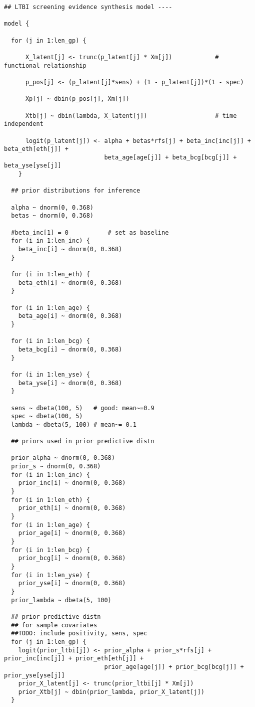 \documentclass[]{article}
\begin{document}
\begin{verbatim}
## LTBI screening evidence synthesis model ----

model {

  for (j in 1:len_gp) {

      X_latent[j] <- trunc(p_latent[j] * Xm[j])            # functional relationship

      p_pos[j] <- (p_latent[j]*sens) + (1 - p_latent[j])*(1 - spec)

      Xp[j] ~ dbin(p_pos[j], Xm[j])

      Xtb[j] ~ dbin(lambda, X_latent[j])                   # time independent

      logit(p_latent[j]) <- alpha + betas*rfs[j] + beta_inc[inc[j]] + beta_eth[eth[j]] +
                            beta_age[age[j]] + beta_bcg[bcg[j]] + beta_yse[yse[j]]
    }

  ## prior distributions for inference

  alpha ~ dnorm(0, 0.368)
  betas ~ dnorm(0, 0.368)

  #beta_inc[1] = 0           # set as baseline
  for (i in 1:len_inc) {
    beta_inc[i] ~ dnorm(0, 0.368)
  }

  for (i in 1:len_eth) {
    beta_eth[i] ~ dnorm(0, 0.368)
  }

  for (i in 1:len_age) {
    beta_age[i] ~ dnorm(0, 0.368)
  }

  for (i in 1:len_bcg) {
    beta_bcg[i] ~ dnorm(0, 0.368)
  }

  for (i in 1:len_yse) {
    beta_yse[i] ~ dnorm(0, 0.368)
  }

  sens ~ dbeta(100, 5)   # good: mean~=0.9
  spec ~ dbeta(100, 5)
  lambda ~ dbeta(5, 100) # mean~= 0.1

  ## priors used in prior predictive distn

  prior_alpha ~ dnorm(0, 0.368)
  prior_s ~ dnorm(0, 0.368)
  for (i in 1:len_inc) {
    prior_inc[i] ~ dnorm(0, 0.368)
  }
  for (i in 1:len_eth) {
    prior_eth[i] ~ dnorm(0, 0.368)
  }
  for (i in 1:len_age) {
    prior_age[i] ~ dnorm(0, 0.368)
  }
  for (i in 1:len_bcg) {
    prior_bcg[i] ~ dnorm(0, 0.368)
  }
  for (i in 1:len_yse) {
    prior_yse[i] ~ dnorm(0, 0.368)
  }
  prior_lambda ~ dbeta(5, 100)

  ## prior predictive distn
  ## for sample covariates
  ##TODO: include positivity, sens, spec
  for (j in 1:len_gp) {
    logit(prior_ltbi[j]) <- prior_alpha + prior_s*rfs[j] + prior_inc[inc[j]] + prior_eth[eth[j]] +
                            prior_age[age[j]] + prior_bcg[bcg[j]] + prior_yse[yse[j]]
    prior_X_latent[j] <- trunc(prior_ltbi[j] * Xm[j])
    prior_Xtb[j] ~ dbin(prior_lambda, prior_X_latent[j])
  }



\end{verbatim}
\end{document}
